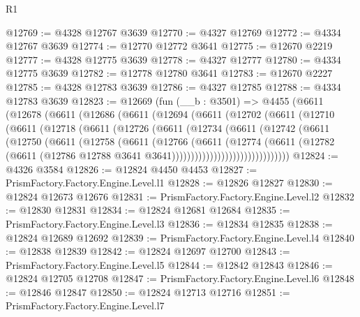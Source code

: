 \begin{lexlean}{R1}
\begin{coremodule}
@12769 := @4328 @12767 @3639
@12770 := @4327 @12769
@12772 := @4334 @12767 @3639
@12774 := @12770 @12772 @3641
@12775 := @12670 @2219
@12777 := @4328 @12775 @3639
@12778 := @4327 @12777
@12780 := @4334 @12775 @3639
@12782 := @12778 @12780 @3641
@12783 := @12670 @2227
@12785 := @4328 @12783 @3639
@12786 := @4327 @12785
@12788 := @4334 @12783 @3639
@12823 := @12669
    (fun (__b : @3501) =>
    @4455
      (@6611
        (@12678
          (@6611
            (@12686
              (@6611
                (@12694
                  (@6611
                    (@12702
                      (@6611
                        (@12710
                          (@6611
                            (@12718
                              (@6611
                                (@12726
                                  (@6611
                                    (@12734
                                      (@6611
                                        (@12742
                                          (@6611
                                            (@12750
                                              (@6611
                                                (@12758
                                                  (@6611
                                                    (@12766
                                                      (@6611
                                                        (@12774
                                                          (@6611
                                                            (@12782
                                                              (@6611
                                                                (@12786
                                                                  @12788
                                                                  @3641
                                                                  @3641)))))))))))))))))))))))))))))))
@12824 := @4326 @3584
@12826 := @12824 @4450 @4453
@12827 := PrismFactory.Factory.Engine.Level.l1
@12828 := @12826 @12827
@12830 := @12824 @12673 @12676
@12831 := PrismFactory.Factory.Engine.Level.l2
@12832 := @12830 @12831
@12834 := @12824 @12681 @12684
@12835 := PrismFactory.Factory.Engine.Level.l3
@12836 := @12834 @12835
@12838 := @12824 @12689 @12692
@12839 := PrismFactory.Factory.Engine.Level.l4
@12840 := @12838 @12839
@12842 := @12824 @12697 @12700
@12843 := PrismFactory.Factory.Engine.Level.l5
@12844 := @12842 @12843
@12846 := @12824 @12705 @12708
@12847 := PrismFactory.Factory.Engine.Level.l6
@12848 := @12846 @12847
@12850 := @12824 @12713 @12716
@12851 := PrismFactory.Factory.Engine.Level.l7

\end{coremodule}
\end{lexlean}
